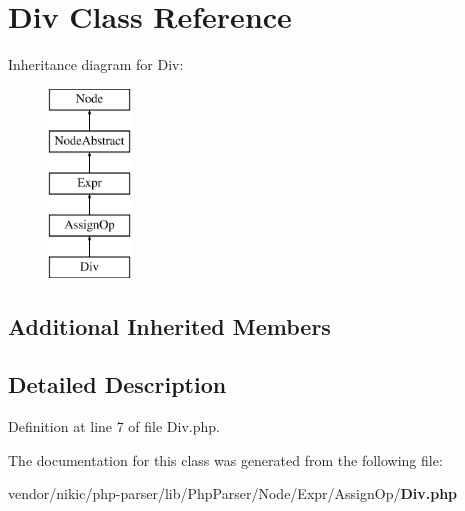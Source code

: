 \section{Div Class Reference}
\label{class_php_parser_1_1_node_1_1_expr_1_1_assign_op_1_1_div}
Inheritance diagram for Div\+:\begin{figure}[H]
\begin{center}
\leavevmode
\includegraphics[height=5.000000cm]{class_php_parser_1_1_node_1_1_expr_1_1_assign_op_1_1_div}
\end{center}
\end{figure}
\subsection*{Additional Inherited Members}


\subsection{Detailed Description}


Definition at line 7 of file Div.\+php.



The documentation for this class was generated from the following file\+:\begin{DoxyCompactItemize}
\item 
vendor/nikic/php-\/parser/lib/\+Php\+Parser/\+Node/\+Expr/\+Assign\+Op/{\bf Div.\+php}\end{DoxyCompactItemize}
